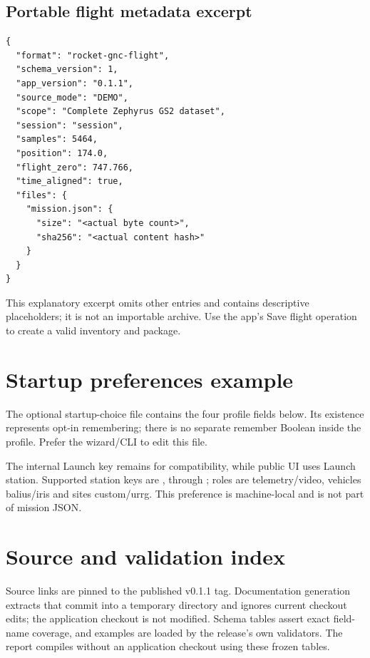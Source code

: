 \subsection{Portable flight metadata excerpt}
\begin{lstlisting}
{
  "format": "rocket-gnc-flight",
  "schema_version": 1,
  "app_version": "0.1.1",
  "source_mode": "DEMO",
  "scope": "Complete Zephyrus GS2 dataset",
  "session": "session",
  "samples": 5464,
  "position": 174.0,
  "flight_zero": 747.766,
  "time_aligned": true,
  "files": {
    "mission.json": {
      "size": "<actual byte count>",
      "sha256": "<actual content hash>"
    }
  }
}
\end{lstlisting}
This explanatory excerpt omits other entries and contains descriptive
placeholders; it is not an importable archive. Use the app's Save flight
operation to create a valid inventory and package.

\section{Startup preferences example}
The optional startup-choice file contains the four profile fields below.
Its existence represents opt-in remembering; there is no separate remember
Boolean inside the profile. Prefer the wizard/CLI to edit this file.

The internal Launch key remains  for compatibility, while public UI
uses Launch station. Supported station keys are , 
through ; roles are telemetry/video, vehicles balius/iris and sites
custom/urrg. This preference is machine-local and is not part of mission JSON.

\section{Source and validation index}\label{app:evidence}
Source links are pinned to the published v0.1.1 tag. Documentation generation
extracts that commit into a temporary directory and ignores current checkout
edits; the application checkout is not modified. Schema tables assert exact
field-name coverage, and examples are loaded by the release's own validators.
The report compiles without an application checkout using these frozen tables.

